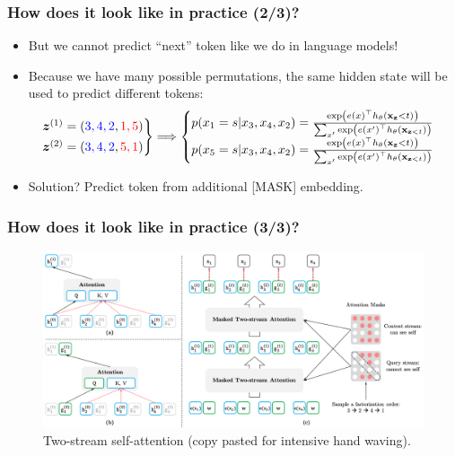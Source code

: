 \documentclass[10pt]{beamer}
\begin{document}
\begin{frame}
\frametitle{How does it look like in practice (2/3)?}
\begin{itemize}
    \item\pause But we cannot predict ``next'' token like we do in language models!
    \item\pause Because we have many possible permutations, the same hidden state will be used to predict different tokens:
\[
\begin{rcases}
\bm z^{(1)} = (\textcolor{blue}{3, 4, 2}, \textcolor{red}{1,5}) \\
\bm z^{(2)} = (\textcolor{blue}{3, 4, 2}, \textcolor{red}{5,1})  
\end{rcases}
\Longrightarrow
\begin{cases}
p(x_1 = s | x_3, x_4, x_2) = \frac{\exp \left(e(x)^{\top} h_{\theta}\left(\mathbf{x}_{\mathbf{z}}<t\right)\right)}{\sum_{x^{\prime}} \exp \left(e\left(x^{\prime}\right)^{\top} h_{\theta}\left(\mathbf{x}_{\mathbf{z}<t}\right)\right)} \\
p(x_5 = s | x_3, x_4, x_2) = \frac{\exp \left(e(x)^{\top} h_{\theta}\left(\mathbf{x}_{\mathbf{z}}<t\right)\right)}{\sum_{x^{\prime}} \exp \left(e\left(x^{\prime}\right)^{\top} h_{\theta}\left(\mathbf{x}_{\mathbf{z}<t}\right)\right)}
\end{cases}
\]
    \item\pause Solution? \pause Predict token from additional [MASK] embedding.
\end{itemize}
\end{frame}

\begin{frame}
    \frametitle{How does it look like in practice (3/3)?}
    \begin{figure}
        \includegraphics[width=\textwidth]{images/two-stream-self-attention.png}
        \caption{Two-stream self-attention (copy pasted for intensive hand waving).}
    \end{figure}
\end{frame}
\end{document}
